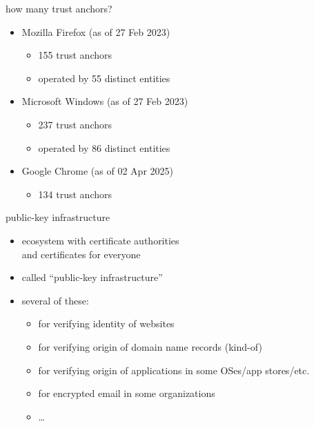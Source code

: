 \begin{frame}{how many trust anchors?}
    \begin{itemize}
    \item Mozilla Firefox (as of 27 Feb 2023)
        \begin{itemize}
            \item 155 trust anchors
            \item operated by 55 distinct entities
        \end{itemize}
    \item Microsoft Windows (as of 27 Feb 2023)
        \begin{itemize}
            \item 237 trust anchors
            \item operated by 86 distinct entities
        \end{itemize}
    \item Google Chrome (as of 02 Apr 2025)
        \begin{itemize}
            \item 134 trust anchors
        \end{itemize}
    \end{itemize}
\end{frame}

\begin{frame}{public-key infrastructure}
    \begin{itemize}
    \item ecosystem with certificate authorities \\
        and certificates for everyone
    \item called ``public-key infrastructure''
        \vspace{.5cm}
    \item several of these:
        \begin{itemize}
        \item for verifying identity of websites
        \item for verifying origin of domain name records (kind-of)
        \item for verifying origin of applications in some OSes/app stores/etc.
        \item for encrypted email in some organizations
        \item \ldots
        \end{itemize}
    \end{itemize}
\end{frame}
